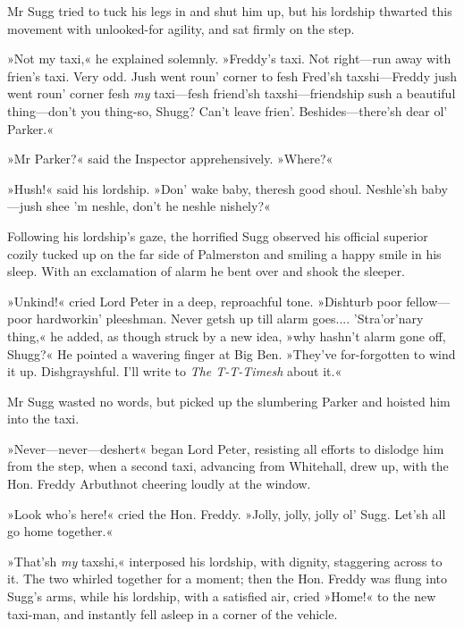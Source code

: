 Mr Sugg tried to tuck his legs in and shut him up, but his lordship thwarted this movement with unlooked-for agility, and sat firmly on the step.

»Not my taxi,« he explained solemnly. »Freddy's taxi. Not right\allowbreak---\allowbreak run away with frien's taxi. Very odd. Jush went roun' corner to fesh Fred'sh taxshi\allowbreak---\allowbreak Freddy jush went roun' corner fesh \textit{my} taxi\allowbreak---\allowbreak fesh friend'sh taxshi\allowbreak---\allowbreak friendship sush a beautiful thing\allowbreak---\allowbreak don't you thing-so, Shugg? Can't leave frien'. Beshides\allowbreak---\allowbreak there'sh dear ol' Parker.«

»Mr Parker?« said the Inspector apprehensively. »Where?«

»Hush!« said his lordship. »Don' wake baby, theresh good shoul.  Neshle'sh baby\allowbreak---\allowbreak jush shee 'm neshle, don't he neshle nishely?«

Following his lordship's gaze, the horrified Sugg observed his official superior cozily tucked up on the far side of Palmerston and smiling a happy smile in his sleep. With an exclamation of alarm he bent over and shook the sleeper.

»Unkind!« cried Lord Peter in a deep, reproachful tone. »Dishturb poor fellow\allowbreak---\allowbreak poor hardworkin' pleeshman. Never getsh up till alarm goes....  'Stra'or'nary thing,« he added, as though struck by a new idea, »why hashn't alarm gone off, Shugg?« He pointed a wavering finger at Big Ben. »They've for-forgotten to wind it up. Dishgrayshful. I'll write to \textit{The T-T-Timesh} about it.«

Mr Sugg wasted no words, but picked up the slumbering Parker and hoisted him into the taxi.

»Never\allowbreak---\allowbreak never---deshert\longdash« began Lord Peter, resisting all efforts to dislodge him from the step, when a second taxi, advancing from Whitehall, drew up, with the Hon. Freddy Arbuthnot cheering loudly at the window.

»Look who's here!« cried the Hon. Freddy. »Jolly, jolly, jolly ol' Sugg. Let'sh all go home together.«

»That'sh \textit{my} taxshi,« interposed his lordship, with dignity, staggering across to it. The two whirled together for a moment; then the Hon. Freddy was flung into Sugg's arms, while his lordship, with a satisfied air, cried »Home!« to the new taxi-man, and instantly fell asleep in a corner of the vehicle.

